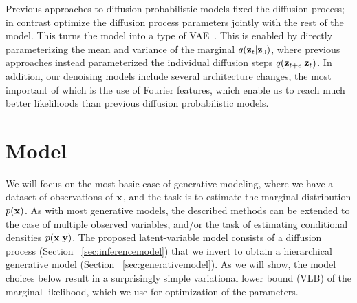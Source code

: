 \documentclass{article}
\begin{document}
Previous approaches to diffusion probabilistic models fixed the diffusion process; in contrast optimize the diffusion process parameters jointly with the rest of the model. This turns the model into a type of VAE~\citep{kingma2013auto,rezende2014stochastic}. This is enabled by directly parameterizing the mean and variance of the marginal $q({\mathbf{z}}_t|{\mathbf{z}}_0)$, where previous approaches instead parameterized the individual diffusion steps $q({\mathbf{z}}_{t+\epsilon}|{\mathbf{z}}_t)$. In addition, our denoising models include several architecture changes, the most important of which is the use of Fourier features, which enable us to reach much better likelihoods than previous diffusion probabilistic models.


%
%
%
%
%

%
%
%
%
%
%
%
%

%

\section{Model}
\label{sec:model}
We will focus on the most basic case of generative modeling, where we have a dataset of observations of ${\mathbf{x}}$, and the task is to estimate the marginal distribution $p({\mathbf{x}})$. As with most generative models, the described methods can be extended to the case of multiple observed variables, and/or the task of estimating conditional densities $p({\mathbf{x}}|{\mathbf{y}})$. The proposed latent-variable model consists of a diffusion process (Section ~\ref{sec:inferencemodel}) that we invert to obtain a hierarchical generative model (Section ~\ref{sec:generativemodel}). As we will show, the model choices below result in a surprisingly simple variational lower bound (VLB) of the marginal likelihood, which we use for optimization of the parameters.
\end{document}
